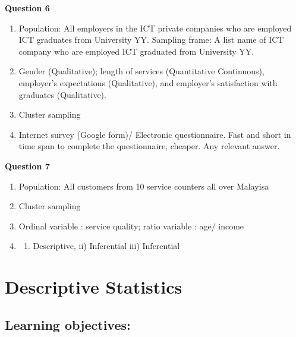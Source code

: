 \documentclass[
  a4paper,
  DIV=11,
  numbers=noendperiod,
  oneside]{scrreprt}
\providecommand{\tightlist}{%
  \setlength{\itemsep}{0pt}\setlength{\parskip}{0pt}}\usepackage{longtable,booktabs,array}
\begin{document}
\textbf{Question 6}

\begin{enumerate}
\def\labelenumi{\alph{enumi})}
\setcounter{enumi}{4}
\tightlist
\item
  Population: All employers in the ICT private companies who are
  employed ICT graduates from University YY. Sampling frame: A list name
  of ICT company who are employed ICT graduated from University YY.
\item
  Gender (Qualitative); length of services (Quantitative Continuous),
  employer's expectations (Qualitative), and employer's satisfaction
  with graduates (Qualitative).
\item
  Cluster sampling
\item
  Internet survey (Google form)/ Electronic questionnaire. Fast and
  short in time span to complete the questionnaire, cheaper. Any
  relevant answer.
\end{enumerate}

\textbf{Question 7}

\begin{enumerate}
\def\labelenumi{\alph{enumi})}
\item
  Population: All customers from 10 service counters all over Malayisa
\item
  Cluster sampling
\item
  Ordinal variable : service quality; ratio variable : age/ income
\item
  \begin{enumerate}
  \def\labelenumii{\roman{enumii})}
  \tightlist
  \item
    Descriptive, ii) Inferential iii) Inferential
  \end{enumerate}
\end{enumerate}


\hypertarget{descriptive-statistics}{%
\chapter{Descriptive Statistics}\label{descriptive-statistics}}

\hypertarget{learning-objectives-1}{%
\section*{Learning objectives:}\label{learning-objectives-1}}

\end{document}
